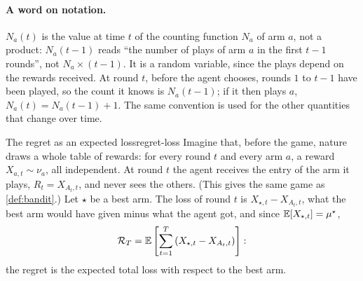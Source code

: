 \paragraph{A word on notation.} $N_a(t)$ is the value at time $t$ of the
counting function $N_a$ of arm $a$, not a product: $N_a(t - 1)$ reads ``the
number of plays of arm $a$ in the first $t - 1$ rounds'', not $N_a \times
(t - 1)$. It is a random variable, since the plays depend on the rewards
received. At round $t$, before the agent chooses, rounds $1$ to $t - 1$ have
been played, so the count it knows is $N_a(t - 1)$; if it then plays $a$,
$N_a(t) = N_a(t - 1) + 1$. The same convention is used for the other
quantities that change over time.

\begin{remark}{The regret as an expected loss}{regret-loss}
  Imagine that, before the game, nature draws a whole table of rewards:
  for every round $t$ and every arm $a$, a reward $X_{a,t} \sim \nu_a$, all
  independent. At round $t$ the agent receives the entry of the arm it
  plays, $R_t = X_{A_t, t}$, and never sees the others. (This gives the
  same game as \cref{def:bandit}.) Let $\star$ be a best arm. The loss of
  round $t$ is $X_{\star, t} - X_{A_t, t}$, what the best arm would have
  given minus what the agent got, and since $\mathbb{E}[X_{\star, t}] = \mu^\star$,
  \begin{equation}
    \mathcal{R}_T = \mathbb{E}\left[ \sum_{t=1}^{T} \left( X_{\star, t} - X_{A_t, t}
    \right) \right]:
  \end{equation}
  the regret is the expected total loss with respect to the best arm.


\end{remark}
